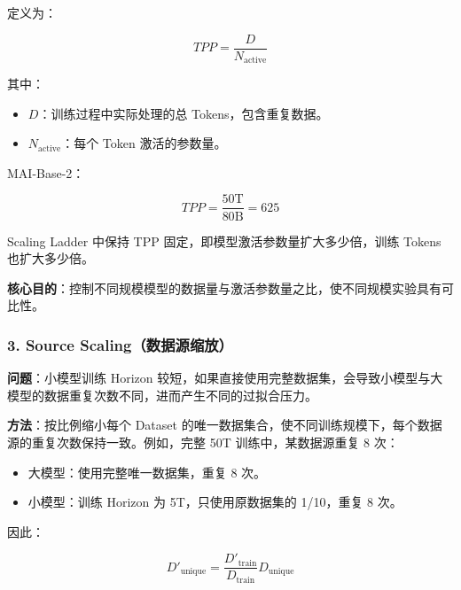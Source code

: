 \documentclass[
  11pt,
  a4paper,
  fontset=none]{ctexart}
\providecommand{\tightlist}{%
  \setlength{\itemsep}{0pt}\setlength{\parskip}{0pt}}
\newenvironment{NotesFormula}{%
  \par\noindent\begin{minipage}{\linewidth}%
  \setlength{\parindent}{2em}%
  \setlength{\parskip}{0.35em}%
}{\end{minipage}\par}
\begin{document}
\begin{NotesFormula}

定义为：

\[\boxed{TPP=\frac{D}{N_{\mathrm{active}}}}\]

\end{NotesFormula}

其中：

\begin{itemize}
\tightlist
\item
  \(D\)：训练过程中实际处理的总 Tokens，包含重复数据。
\item
  \(N_{\mathrm{active}}\)：每个 Token 激活的参数量。
\end{itemize}

\begin{NotesFormula}

MAI-Base-2：

\[TPP=\frac{50\mathrm{T}}{80\mathrm{B}}=625\]

\end{NotesFormula}

Scaling Ladder 中保持 TPP 固定，即模型激活参数量扩大多少倍，训练 Tokens
也扩大多少倍。

\textbf{核心目的}：控制不同规模模型的数据量与激活参数量之比，使不同规模实验具有可比性。

\subsubsection{3. Source
Scaling（数据源缩放）}\label{source-scalingux6570ux636eux6e90ux7f29ux653e}

\textbf{问题}：小模型训练 Horizon
较短，如果直接使用完整数据集，会导致小模型与大模型的数据重复次数不同，进而产生不同的过拟合压力。

\textbf{方法}：按比例缩小每个 Dataset
的唯一数据集合，使不同训练规模下，每个数据源的重复次数保持一致。例如，完整
50T 训练中，某数据源重复 8 次：

\begin{itemize}
\tightlist
\item
  大模型：使用完整唯一数据集，重复 8 次。
\item
  小模型：训练 Horizon 为 5T，只使用原数据集的 1/10，重复 8 次。
\end{itemize}

\begin{NotesFormula}

因此：

\[D'_{\mathrm{unique}}=\frac{D'_{\mathrm{train}}}{D_{\mathrm{train}}}D_{\mathrm{unique}}\]

\end{NotesFormula}
\end{document}
